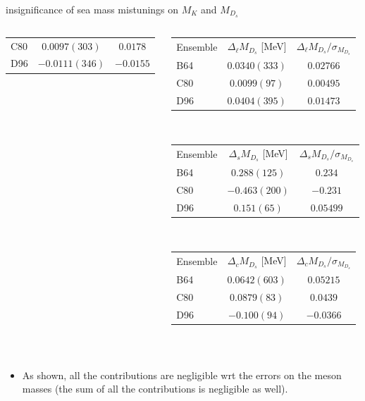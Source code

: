 \documentclass[xcolor={dvipsnames,table}]{beamer}
\begin{document}
\begin{frame}{insignificance of sea mass mistunings on $M_K$ and $M_{D_s}$}
\begin{columns}
\begin{column}{0.5\textwidth}
\begin{center}
\begin{tabular}{l|c|c}
       C80  & $0.0097(303)$  & $0.0178$ \\
       D96  & $-0.0111(346)$ & $-0.0155$ \\
       \end{tabular}
       \end{center}
    \end{column}
    \begin{column}{0.5\textwidth}
    \begin{center}
    \begin{tabular}{l|c|c}
    Ensemble
    & $\Delta_{\ell}M_{D_s}$ [MeV]
    & $\Delta_{\ell}M_{D_s}/\sigma_{M_{D_s}}$ \\
    B64  & $0.0340(333)$ & $0.02766$ \\
    C80  & $0.0099(97)$  & $0.00495$ \\
    D96  & $0.0404(395)$ & $0.01473$ \\
    \end{tabular}
    \vspace*{0.2cm}\,
    \\
    \centering
    \begin{tabular}{l|c|c}
    Ensemble
    & $\Delta_{s}M_{D_s}$ [MeV]
    & $\Delta_{s}M_{D_s}/\sigma_{M_{D_s}}$ \\
    B64  & $0.288(125)$  & $0.234$ \\
    C80  & $-0.463(200)$ & $-0.231$ \\
    D96  & $0.151(65)$   & $0.05499$ \\
    \end{tabular}
    \vspace*{0.2cm}\,
    \\
    \centering
    \begin{tabular}{l|c|c}
    Ensemble
    & $\Delta_{c}M_{D_s}$ [MeV]
    & $\Delta_{c}M_{D_s}/\sigma_{M_{D_s}}$ \\
    B64  & $0.0642(603)$  & $0.05215$ \\
    C80  & $0.0879(83)$   & $0.0439$ \\
    D96  & $-0.100(94)$   & $-0.0366$ \\
    \end{tabular}
    \end{center}
    \end{column}
  \end{columns}
\vspace*{0.1cm}\,
\begin{itemize}
    \item As shown, all the contributions are negligible wrt the errors on the meson masses (the sum of all the contributions is negligible as well).
\end{itemize}
\end{frame}
\end{document}
